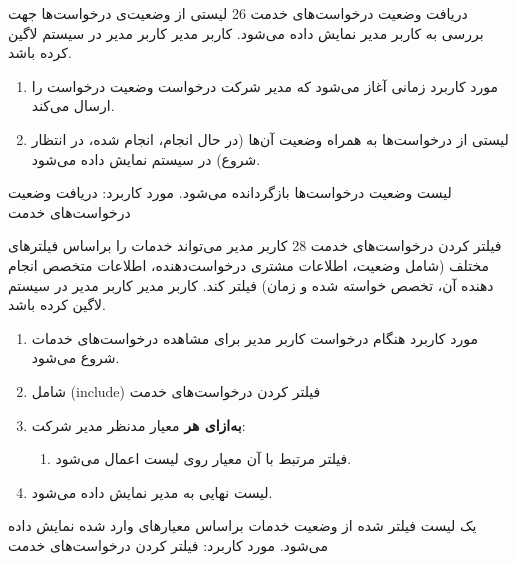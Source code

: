 
{
\usecase
{دریافت وضعیت درخواست‌های خدمت}
{26}
{لیستی از وضعیت‌ی درخواست‌ها جهت بررسی به کاربر مدیر نمایش داده می‌شود.}
{کاربر مدیر}
{}
{کاربر مدیر در سیستم لاگین کرده باشد.}
{
	\vspace*{-0.6cm}
	\begin{enumerate}
		\item مورد کاربرد زمانی آغاز می‌شود که مدیر شرکت درخواست وضعیت درخواست را ارسال می‌کند.
		\item 
		لیستی از درخواست‌ها به همراه وضعیت آن‌ها (در حال انجام، انجام شده، در انتظار شروع) در سیستم نمایش داده می‌شود.
	\end{enumerate}
}
{لیست وضعیت درخواست‌ها بازگردانده می‌شود.}
{
}
{
	مورد کاربرد: دریافت وضعیت درخواست‌های خدمت
}
}

{
\usecase
{
	فیلتر کردن درخواست‌های خدمت
}
{28}
{کاربر مدیر می‌تواند خدمات را براساس فیلتر‌های مختلف (شامل وضعیت، اطلاعات مشتری درخواست‌دهنده،‌ اطلاعات متخصص انجام دهنده آن، تخصص خواسته شده و زمان) فیلتر کند. }
{کاربر مدیر}
{}
{کاربر مدیر در سیستم لاگین کرده باشد.}
{
	\vspace*{-0.6cm}
	\begin{enumerate}
		\item مورد کاربرد هنگام درخواست کاربر مدیر برای مشاهده درخواست‌های خدمات شروع می‌شود.
		\item 
شامل	(include) فیلتر کردن درخواست‌های خدمت
		\item
		\textbf{به‌ازای هر} معیار مدنظر مدیر شرکت:
		\begin{enumerate}[label=\theenumi.\arabic*.]
			\item فیلتر مرتبط با آن معیار روی لیست اعمال می‌شود.
		\end{enumerate}
		\item لیست نهایی به مدیر نمایش داده می‌شود.
	\end{enumerate}
}
{یک لیست فیلتر شده از وضعیت خدمات براساس معیارهای وارد شده نمایش داده می‌شود.}
{
}
{
	مورد کاربرد: فیلتر کردن درخواست‌های خدمت
}
}

